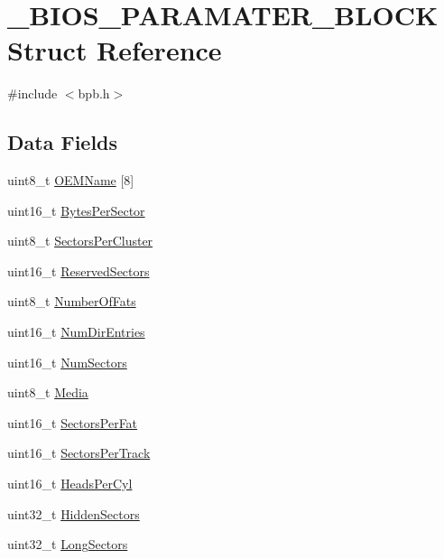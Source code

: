 \hypertarget{struct__BIOS__PARAMATER__BLOCK}{}\section{\+\_\+\+B\+I\+O\+S\+\_\+\+P\+A\+R\+A\+M\+A\+T\+E\+R\+\_\+\+B\+L\+O\+CK Struct Reference}
\label{struct__BIOS__PARAMATER__BLOCK}


{\ttfamily \#include $<$bpb.\+h$>$}

\subsection*{Data Fields}
\begin{DoxyCompactItemize}
\item 
uint8\+\_\+t \hyperlink{struct__BIOS__PARAMATER__BLOCK_a26e26852f15470344d8f29193a91b35c}{O\+E\+M\+Name} \mbox{[}8\mbox{]}
\item 
uint16\+\_\+t \hyperlink{struct__BIOS__PARAMATER__BLOCK_a66104ad70bc3243f824e6d3a5203017d}{Bytes\+Per\+Sector}
\item 
uint8\+\_\+t \hyperlink{struct__BIOS__PARAMATER__BLOCK_a32547c8a012ea20bff27d83f7dfeea97}{Sectors\+Per\+Cluster}
\item 
uint16\+\_\+t \hyperlink{struct__BIOS__PARAMATER__BLOCK_a9bc98792061fb38071840cc6c61d4bd9}{Reserved\+Sectors}
\item 
uint8\+\_\+t \hyperlink{struct__BIOS__PARAMATER__BLOCK_a19dde0c3c6c8dd2d20ef53bc9dc71da8}{Number\+Of\+Fats}
\item 
uint16\+\_\+t \hyperlink{struct__BIOS__PARAMATER__BLOCK_a9d9f79e3acd72e08ff27fb471569c841}{Num\+Dir\+Entries}
\item 
uint16\+\_\+t \hyperlink{struct__BIOS__PARAMATER__BLOCK_a98d94e48588132acbd65fedd4de95647}{Num\+Sectors}
\item 
uint8\+\_\+t \hyperlink{struct__BIOS__PARAMATER__BLOCK_a8b01f1d4dd34a1ef4c42a5ab83d3bf04}{Media}
\item 
uint16\+\_\+t \hyperlink{struct__BIOS__PARAMATER__BLOCK_adc667cf101250030eb318e36b38487ea}{Sectors\+Per\+Fat}
\item 
uint16\+\_\+t \hyperlink{struct__BIOS__PARAMATER__BLOCK_a78ea312224353e262bc1c1af91f4ccde}{Sectors\+Per\+Track}
\item 
uint16\+\_\+t \hyperlink{struct__BIOS__PARAMATER__BLOCK_a71a6800e1d31abe25b353b5b9b84c545}{Heads\+Per\+Cyl}
\item 
uint32\+\_\+t \hyperlink{struct__BIOS__PARAMATER__BLOCK_ad31ae2c22a4f844d1b9be9f1d7034a31}{Hidden\+Sectors}
\item 
uint32\+\_\+t \hyperlink{struct__BIOS__PARAMATER__BLOCK_a5b718eec0b4cb2f08ba2ec2578906e8a}{Long\+Sectors}
\end{DoxyCompactItemize}


